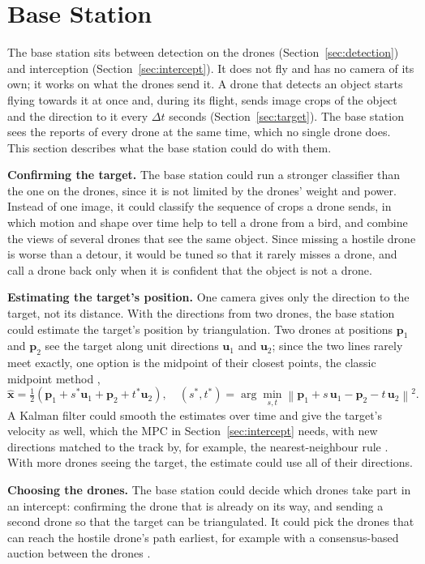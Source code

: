 \section{Base Station}
\label{sec:base-station}

The base station sits between detection on the drones
(Section~\ref{sec:detection}) and interception (Section~\ref{sec:intercept}).
It does not fly and has no camera of its own; it works on what the drones send
it. A drone that detects an object starts flying towards it at once and, during
its flight, sends image crops of the object and the direction to it every
$\Delta t$ seconds (Section~\ref{sec:target}). The base station sees the
reports of every drone at the same time, which no single drone does. This
section describes what the base station could do with them.

\textbf{Confirming the target.} The base station could run a stronger
classifier than the one on the drones, since it is not limited by the drones'
weight and power. Instead of one image, it could classify the sequence of
crops a drone sends, in which motion and shape over time help to tell a drone
from a bird, and combine the views of several drones that see the same
object. Since missing a hostile drone is worse than a detour, it would be
tuned so that it rarely misses a drone, and call a drone back only when it is
confident that the object is not a drone.

\textbf{Estimating the target's position.} One camera gives only the direction
to the target, not its distance. With the directions from two drones, the
base station could estimate the target's position by triangulation. Two
drones at positions $\mathbf{p}_1$ and $\mathbf{p}_2$ see the target along unit
directions $\mathbf{u}_1$ and $\mathbf{u}_2$; since the two lines rarely meet
exactly, one option is the midpoint of their closest points, the classic
midpoint method \cite{hartley1997triangulation, hartley2004multiple},
\begin{equation}
  \hat{\mathbf{x}} = \tfrac{1}{2}\left(\mathbf{p}_1 + s^\ast\mathbf{u}_1
                   + \mathbf{p}_2 + t^\ast\mathbf{u}_2\right),
  \quad
  (s^\ast, t^\ast) = \arg\min_{s,t}
  \left\|\mathbf{p}_1 + s\,\mathbf{u}_1 - \mathbf{p}_2 - t\,\mathbf{u}_2\right\|^2 .
  \label{eq:triangulation}
\end{equation}
A Kalman filter could smooth the estimates over time and give the target's
velocity as well, which the MPC in Section~\ref{sec:intercept} needs, with new
directions matched to the track by, for example, the nearest-neighbour rule
\cite{barshalom2001estimation}. With more drones seeing the target, the
estimate could use all of their directions.

\textbf{Choosing the drones.} The base station could decide which drones take
part in an intercept: confirming the drone that is already on its way, and
sending a second drone so that the target can be triangulated. It could pick
the drones that can reach the hostile drone's path earliest, for example with
a consensus-based auction between the drones \cite{choi2009consensus}.
